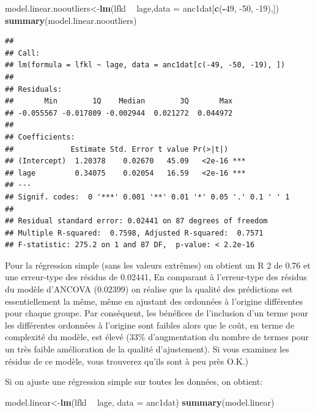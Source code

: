 \documentclass[12pt,]{book}
\newenvironment{Shaded}{\begin{snugshade}}{\end{snugshade}}
\newcommand{\DataTypeTok}[1]{\textcolor[rgb]{0.13,0.29,0.53}{#1}}
\newcommand{\DecValTok}[1]{\textcolor[rgb]{0.00,0.00,0.81}{#1}}
\newcommand{\KeywordTok}[1]{\textcolor[rgb]{0.13,0.29,0.53}{\textbf{#1}}}
\newcommand{\NormalTok}[1]{#1}
\newcommand{\OperatorTok}[1]{\textcolor[rgb]{0.81,0.36,0.00}{\textbf{#1}}}
\newcommand{\StringTok}[1]{\textcolor[rgb]{0.31,0.60,0.02}{#1}}
\begin{document}
\begin{Shaded}
\begin{Highlighting}[]
\NormalTok{model.linear.nooutliers<-}\KeywordTok{lm}\NormalTok{(lfkl }\OperatorTok{~}\StringTok{ }\NormalTok{lage,}\DataTypeTok{data =}\NormalTok{ anc1dat[}\KeywordTok{c}\NormalTok{(}\OperatorTok{-}\DecValTok{49}\NormalTok{, }\DecValTok{-50}\NormalTok{, }\DecValTok{-19}\NormalTok{),])}
\KeywordTok{summary}\NormalTok{(model.linear.nooutliers)}
\end{Highlighting}
\end{Shaded}

\begin{verbatim}
## 
## Call:
## lm(formula = lfkl ~ lage, data = anc1dat[c(-49, -50, -19), ])
## 
## Residuals:
##       Min        1Q    Median        3Q       Max 
## -0.055567 -0.017809 -0.002944  0.021272  0.044972 
## 
## Coefficients:
##             Estimate Std. Error t value Pr(>|t|)    
## (Intercept)  1.20378    0.02670   45.09   <2e-16 ***
## lage         0.34075    0.02054   16.59   <2e-16 ***
## ---
## Signif. codes:  0 '***' 0.001 '**' 0.01 '*' 0.05 '.' 0.1 ' ' 1
## 
## Residual standard error: 0.02441 on 87 degrees of freedom
## Multiple R-squared:  0.7598, Adjusted R-squared:  0.7571 
## F-statistic: 275.2 on 1 and 87 DF,  p-value: < 2.2e-16
\end{verbatim}

Pour la régression simple (sans les valeurs extrêmes) on obtient un R 2 de 0.76 et une erreur-type des résidus de 0.02441, En comparant à l'erreur-type des résidus du modèle d'ANCOVA (0.02399) on réalise que la qualité des prédictions est essentiellement la même, même en ajustant des ordonnées à l'origine différentes pour chaque groupe. Par conséquent, les bénéfices de l'inclusion d'un terme pour les différentes ordonnées à l'origine sont faibles alors que le coût, en terme de complexité du modèle, est élevé (33\% d'augmentation du nombre de termes pour un très faible amélioration de la qualité d'ajustement). Si vous examinez les résidus de ce modèle, vous trouverez qu'ils sont à peu près O.K.)

Si on ajuste une régression simple sur toutes les données, on obtient:

\begin{Shaded}
\begin{Highlighting}[]
\NormalTok{model.linear<-}\KeywordTok{lm}\NormalTok{(lfkl }\OperatorTok{~}\StringTok{ }\NormalTok{lage, }\DataTypeTok{data =}\NormalTok{ anc1dat)}
\KeywordTok{summary}\NormalTok{(model.linear)}
\end{Highlighting}
\end{Shaded}
\end{document}
